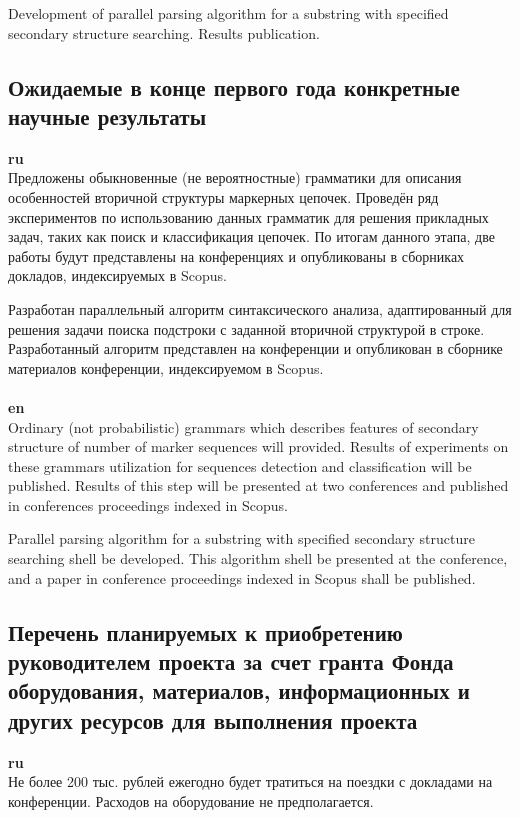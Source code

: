\documentclass[12pt]{article}  %
\theoremstyle{remark}
\begin{document}
Development of parallel parsing algorithm for a substring with specified secondary structure searching. Results publication.

\subsection{Ожидаемые в конце первого года конкретные научные результаты}

\textbf{ru}\\
Предложены обыкновенные (не вероятностные) грамматики для описания особенностей вторичной структуры маркерных цепочек.
Проведён ряд экспериментов по использованию данных грамматик для решения прикладных задач, таких как поиск и классификация цепочек.
По итогам данного этапа, две работы будут представлены на конференциях и опубликованы в сборниках докладов, индексируемых в Scopus.

Разработан параллельный алгоритм синтаксического анализа, адаптированный для решения задачи поиска подстроки с заданной вторичной структурой в строке.
Разработанный алгоритм представлен на конференции и опубликован в сборнике материалов конференции, индексируемом в Scopus.
\\
\\
\textbf{en}\\
Ordinary (not probabilistic) grammars which describes features of secondary structure of number of marker sequences will provided.
Results of experiments on these grammars utilization for sequences detection and classification will be published.
Results of this step will be presented at two conferences and published in conferences proceedings indexed in Scopus.

Parallel parsing algorithm for a substring with specified secondary structure searching shell be developed.
This algorithm shell be presented at the conference, and a paper in conference proceedings indexed in Scopus shall be published.

\subsection{Перечень планируемых к приобретению руководителем проекта за счет гранта Фонда оборудования, материалов, информационных и других ресурсов для выполнения проекта}

\textbf{ru}\\
Не более 200 тыс. рублей ежегодно будет тратиться на поездки с докладами на конференции. Расходов на оборудование не предполагается.
\end{document}
